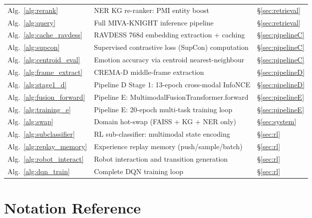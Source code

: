 \documentclass[12pt,a4paper]{article}
\theoremstyle{definition}
\theoremstyle{plain}
\theoremstyle{remark}
\begin{document}
\begin{longtable}{p{4.0cm}p{7.0cm}p{3.2cm}}
Alg.~\ref{alg:rerank} & NER KG re-ranker: PMI entity boost & \S\ref{sec:retrieval} \\[3pt]
Alg.~\ref{alg:query} & Full MIVA-KNIGHT inference pipeline & \S\ref{sec:retrieval} \\[3pt]
Alg.~\ref{alg:cache_ravdess} & RAVDESS 768d embedding extraction + caching & \S\ref{sec:pipelineC} \\[3pt]
Alg.~\ref{alg:supcon} & Supervised contrastive loss (SupCon) computation & \S\ref{sec:pipelineC} \\[3pt]
Alg.~\ref{alg:centroid_eval} & Emotion accuracy via centroid nearest-neighbour & \S\ref{sec:pipelineC} \\[3pt]
Alg.~\ref{alg:frame_extract} & CREMA-D middle-frame extraction & \S\ref{sec:pipelineD} \\[3pt]
Alg.~\ref{alg:stage1_d} & Pipeline D Stage 1: 13-epoch cross-modal InfoNCE & \S\ref{sec:pipelineD} \\[3pt]
Alg.~\ref{alg:fusion_forward} & Pipeline E: MultimodalFusionTransformer.forward & \S\ref{sec:pipelineE} \\[3pt]
Alg.~\ref{alg:training_e} & Pipeline E: 20-epoch multi-task training loop & \S\ref{sec:pipelineE} \\[3pt]
Alg.~\ref{alg:swap} & Domain hot-swap (FAISS + KG + NER only) & \S\ref{sec:system} \\[3pt]
Alg.~\ref{alg:subclassifier} & RL sub-classifier: multimodal state encoding & \S\ref{sec:rl} \\[3pt]
Alg.~\ref{alg:replay_memory} & Experience replay memory (push/sample/batch) & \S\ref{sec:rl} \\[3pt]
Alg.~\ref{alg:robot_interact} & Robot interaction and transition generation & \S\ref{sec:rl} \\[3pt]
Alg.~\ref{alg:dqn_train} & Complete DQN training loop & \S\ref{sec:rl} \\[3pt]
\end{longtable}

\section{Notation Reference}
\end{document}
